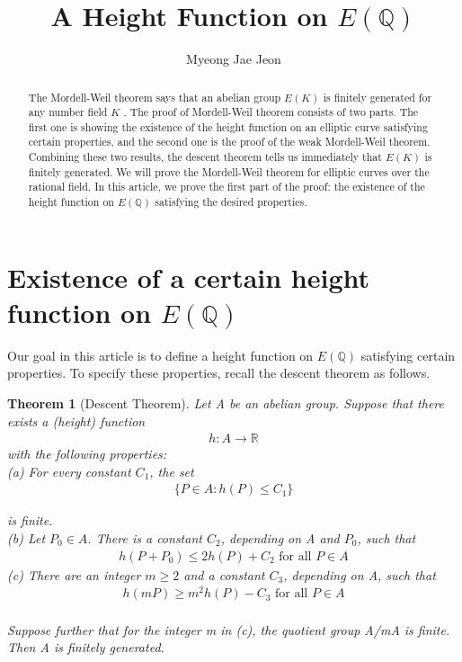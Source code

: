 \documentclass[11pt]{article}
\title{A Height Function on \(E(\mathbb{Q})\)}
\author{Myeong Jae Jeon}
\date{}
\newcommand{\<}{\langle}
\renewcommand{\>}{\rangle}
\numberwithin{equation}{section}
\theoremstyle{plain}
\newtheorem{thm}{Theorem}[section]
\theoremstyle{definition}
\begin{document}
\maketitle

\begin{abstract}
The Mordell-Weil theorem says that an abelian group \(E(K)\) is finitely generated for any number field \(K\) . The proof of Mordell-Weil theorem consists of two parts. The first one is showing the existence of the height function on an elliptic curve satisfying certain properties, and the second one is the proof of the weak Mordell-Weil theorem. Combining these two results, the descent theorem tells us immediately that \(E(K)\) is finitely generated. We will prove the Mordell-Weil theorem for elliptic curves over the rational field. In this article, we prove the first part of the proof: the existence of the height function on \(E(\mathbb{Q})\) satisfying the desired properties. 
\end{abstract}

\section{Existence of a certain height function on \(E(\mathbb{Q})\)} \label{section-E}
Our goal in this article is to define a height function on \(E(\mathbb{Q})\) satisfying certain properties. To specify these properties, recall the descent theorem as follows.

\begin{thm}[Descent Theorem]
 Let A be an abelian group. Suppose that there exists a (height) function
    \begin{align*}
        h:A \xrightarrow{} \mathbb{R}
    \end{align*}
    with the following properties: \\
    (a) For every constant \(C_1\), the set
        \begin{gather*}
            \{P \in A : h(P) \leq C_1\}
        \end{gather*} 
            \par is finite. \\
    (b) Let \(P_0 \in A\). There is a constant \(C_2\), depending on A and \(P_0\), such that
        \begin{gather*}
            h(P+ P_0) \leq 2h(P) + C_2 \text{  for all \(P \in A\)}
        \end{gather*}
    (c) There are an integer \(m \geq 2\) and a constant \(C_3\), depending on A, such that
        \begin{gather*}
            h(mP) \geq m^2 h(P) - C_3 \text{  for all \(P \in A\)}
        \end{gather*} \\
    Suppose further that for the integer m in (c), the quotient group A/mA is finite. Then A is finitely generated.
\end{thm}
\end{document}
